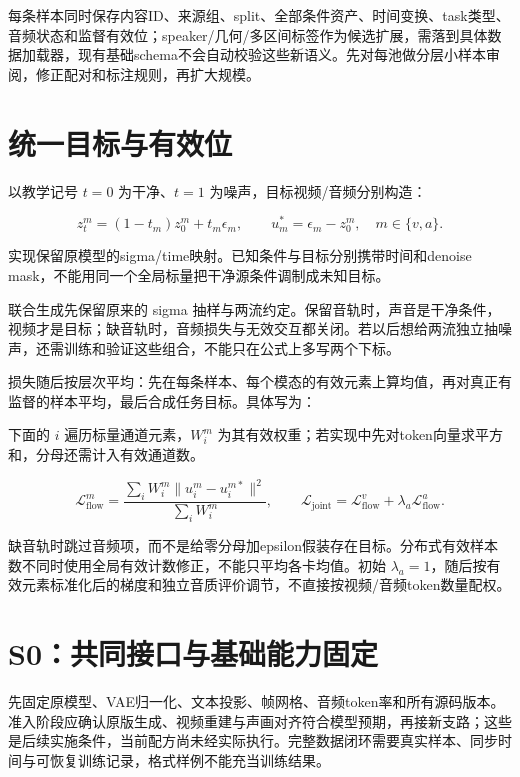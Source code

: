 每条样本同时保存内容ID、来源组、split、全部条件资产、时间变换、task类型、音频状态和监督有效位；speaker/几何/多区间标签作为候选扩展，需落到具体数据加载器，现有基础schema不会自动校验这些新语义。先对每池做分层小样本审阅，修正配对和标注规则，再扩大规模。

\section{统一目标与有效位}\label{seedance-m20-ux7edfux4e00ux76eeux6807ux4e0eux6709ux6548ux4f4d}

以教学记号 \(t=0\) 为干净、\(t=1\) 为噪声，目标视频/音频分别构造：

\[
z_t^m=(1-t_m)z_0^m+t_m\epsilon_m,
\qquad u_m^*=\epsilon_m-z_0^m,\quad m\in\{v,a\}.
\]

实现保留原模型的sigma/time映射。已知条件与目标分别携带时间和denoise mask，不能用同一个全局标量把干净源条件调制成未知目标。

联合生成先保留原来的 sigma 抽样与两流约定。保留音轨时，声音是干净条件，视频才是目标；缺音轨时，音频损失与无效交互都关闭。若以后想给两流独立抽噪声，还需训练和验证这些组合，不能只在公式上多写两个下标。

损失随后按层次平均：先在每条样本、每个模态的有效元素上算均值，再对真正有监督的样本平均，最后合成任务目标。具体写为：

下面的 \(i\) 遍历标量通道元素，\(W_i^m\) 为其有效权重；若实现中先对token向量求平方和，分母还需计入有效通道数。

\[
\mathcal{L}_{\mathrm{flow}}^m=
\frac{\sum_i W_i^m\lVert u_i^m-u_i^{m*}\rVert^2}
{\sum_i W_i^m},\qquad
\mathcal{L}_{\mathrm{joint}}=\mathcal{L}_{\mathrm{flow}}^v+
\lambda_a\mathcal{L}_{\mathrm{flow}}^a.
\]

缺音轨时跳过音频项，而不是给零分母加epsilon假装存在目标。分布式有效样本数不同时使用全局有效计数修正，不能只平均各卡均值。初始 \(\lambda_a=1\)，随后按有效元素标准化后的梯度和独立音质评价调节，不直接按视频/音频token数量配权。

\section{S0：共同接口与基础能力固定}\label{seedance-m20-s0ux5171ux540cux63a5ux53e3ux4e0eux57faux7840ux80fdux529bux56faux5b9a}

先固定原模型、VAE归一化、文本投影、帧网格、音频token率和所有源码版本。准入阶段应确认原版生成、视频重建与声画对齐符合模型预期，再接新支路；这些是后续实施条件，当前配方尚未经实际执行。完整数据闭环需要真实样本、同步时间与可恢复训练记录，格式样例不能充当训练结果。

